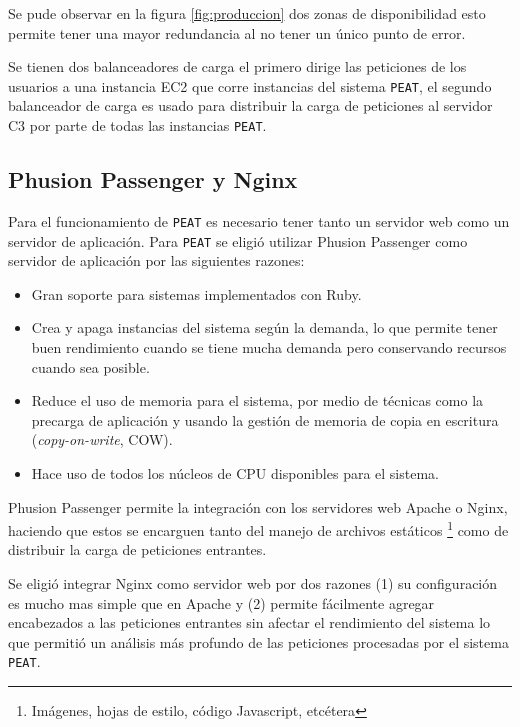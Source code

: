 Se pude observar en la figura \ref{fig:produccion} dos zonas de disponibilidad
esto permite tener una mayor redundancia al no tener un único punto de error.

Se tienen dos balanceadores de carga el primero dirige las peticiones de los
usuarios a una instancia EC2 que corre instancias del sistema \texttt{PEAT},
el segundo balanceador de carga es usado para distribuir la carga de peticiones
al servidor C3 por parte de todas las instancias \texttt{PEAT}.

\subsection{Phusion Passenger y Nginx}

Para el funcionamiento de \texttt{PEAT} es necesario tener tanto un servidor web
como un servidor de aplicación.
Para \texttt{PEAT} se eligió utilizar Phusion Passenger como servidor de aplicación
por las siguientes razones:

\begin{itemize}
\item Gran soporte para sistemas implementados con Ruby.
\item Crea y apaga instancias del sistema según la demanda, lo que permite tener
  buen rendimiento cuando se tiene mucha demanda pero conservando recursos cuando
  sea posible.
\item Reduce el uso de memoria para el sistema, por medio de técnicas como
  la precarga de aplicación y usando la gestión de memoria de copia en escritura
  (\textit{copy-on-write}, COW).
\item Hace uso de todos los núcleos de CPU disponibles para el sistema.
\end{itemize}

Phusion Passenger permite la integración con los servidores web Apache o Nginx,
haciendo que estos se encarguen tanto del manejo de archivos estáticos
\footnote{Imágenes, hojas de estilo, código Javascript, etcétera} como de distribuir
la carga de peticiones entrantes.

Se eligió integrar Nginx como servidor web por dos razones (1) su configuración es
mucho mas simple que en Apache y (2) permite fácilmente agregar encabezados a las
peticiones entrantes sin afectar el rendimiento del sistema lo que permitió un
análisis más profundo de las peticiones procesadas por el sistema \texttt{PEAT}.

